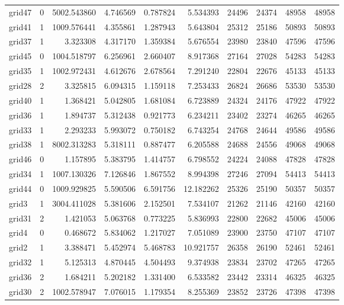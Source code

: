 \begin{longtable}{|l|r|r|r|r|r|r|r|r|r|}
grid47 & 0 & 5002.543860 & 4.746569 & 0.787824 & 5.534393 & 24496 & 24374 & 48958 & 48958 \\
grid41 & 1 & 1009.576441 & 4.355861 & 1.287943 & 5.643804 & 25312 & 25186 & 50893 & 50893 \\
grid37 & 1 & 3.323308 & 4.317170 & 1.359384 & 5.676554 & 23980 & 23840 & 47596 & 47596 \\
grid45 & 0 & 1004.518797 & 6.256961 & 2.660407 & 8.917368 & 27164 & 27028 & 54283 & 54283 \\
grid35 & 1 & 1002.972431 & 4.612676 & 2.678564 & 7.291240 & 22804 & 22676 & 45133 & 45133 \\
grid28 & 2 & 3.325815 & 6.094315 & 1.159118 & 7.253433 & 26824 & 26686 & 53530 & 53530 \\
grid40 & 1 & 1.368421 & 5.042805 & 1.681084 & 6.723889 & 24324 & 24176 & 47922 & 47922 \\
grid36 & 1 & 1.894737 & 5.312438 & 0.921773 & 6.234211 & 23402 & 23274 & 46265 & 46265 \\
grid33 & 1 & 2.293233 & 5.993072 & 0.750182 & 6.743254 & 24768 & 24644 & 49586 & 49586 \\
grid38 & 1 & 8002.313283 & 5.318111 & 0.887477 & 6.205588 & 24688 & 24556 & 49068 & 49068 \\
grid46 & 0 & 1.157895 & 5.383795 & 1.414757 & 6.798552 & 24224 & 24088 & 47828 & 47828 \\
grid34 & 1 & 1007.130326 & 7.126846 & 1.867552 & 8.994398 & 27246 & 27094 & 54413 & 54413 \\
grid44 & 0 & 1009.929825 & 5.590506 & 6.591756 & 12.182262 & 25326 & 25190 & 50357 & 50357 \\
grid3 & 1 & 3004.411028 & 5.381606 & 2.152501 & 7.534107 & 21262 & 21146 & 42160 & 42160 \\
grid31 & 2 & 1.421053 & 5.063768 & 0.773225 & 5.836993 & 22800 & 22682 & 45006 & 45006 \\
grid4 & 0 & 0.468672 & 5.834062 & 1.217027 & 7.051089 & 23900 & 23750 & 47107 & 47107 \\
grid2 & 1 & 3.388471 & 5.452974 & 5.468783 & 10.921757 & 26358 & 26190 & 52461 & 52461 \\
grid32 & 1 & 5.125313 & 4.870445 & 4.504493 & 9.374938 & 23834 & 23702 & 47265 & 47265 \\
grid36 & 2 & 1.684211 & 5.202182 & 1.331400 & 6.533582 & 23442 & 23314 & 46325 & 46325 \\
grid30 & 2 & 1002.578947 & 7.076015 & 1.179354 & 8.255369 & 23852 & 23726 & 47398 & 47398 \\

\end{longtable}
